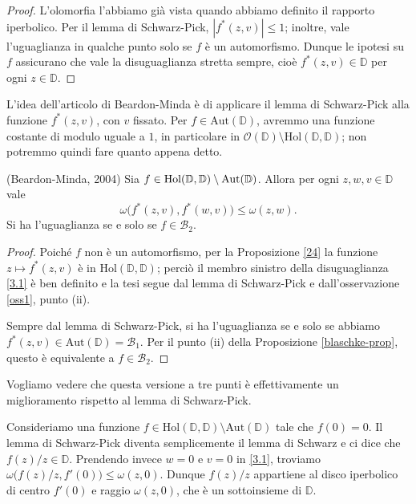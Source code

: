 \begin{proof}
  L'olomorfia l'abbiamo già vista quando abbiamo definito il rapporto iperbolico. Per il lemma di Schwarz-Pick, $|f^*(z,v)| \le 1$; inoltre, vale l'uguaglianza in qualche punto solo se $f$ è un automorfismo. Dunque le ipotesi su $f$ assicurano che vale la disuguaglianza stretta sempre, cioè $f^*(z,v) \in \mathbb{D}$ per ogni $z \in \mathbb{D}$.
\end{proof}

L'idea dell'articolo di Beardon-Minda è di applicare il lemma di Schwarz-Pick alla funzione $f^*(z,v)$, con $v$ fissato. Per $f \in \text{Aut}(\mathbb{D})$, avremmo una funzione costante di modulo uguale a $1$, in particolare in $\mathcal{O}(\mathbb{D})\setminus\text{Hol}(\mathbb{D},\mathbb{D})$; non potremmo quindi fare quanto appena detto.

\begin{thm} \label{31}
  (Beardon-Minda, 2004) Sia $f \in \text{\normalfont{Hol}}(\mathbb{D},\mathbb{D})\setminus\text{\normalfont{Aut}}(\mathbb{D})$. Allora per ogni $z, w, v \in \mathbb{D}$ vale
  \begin{equation} \label{3.1}
    \omega\bigl(f^*(z,v),f^*(w,v)\bigr) \le \omega(z,w).
  \end{equation}
  Si ha l'uguaglianza se e solo se $f \in \mathcal{B}_2$.
\end{thm}

\begin{proof}
  Poiché $f$ non è un automorfismo, per la Proposizione \ref{24} la funzione $z \longmapsto f^*(z,v)$ è in $\text{Hol}(\mathbb{D}, \mathbb{D})$; perciò il membro sinistro della disuguaglianza \eqref{3.1} è ben definito e la tesi segue dal lemma di Schwarz-Pick e dall'osservazione \ref{oss1}, punto (ii).

  Sempre dal lemma di Schwarz-Pick, si ha l'uguaglianza se e solo se abbiamo $f^*(z,v) \in \text{Aut}(\mathbb{D})=\mathcal{B}_1$. Per il punto (ii) della Proposizione \ref{blaschke-prop}, questo è equivalente a $f \in \mathcal{B}_2$.
\end{proof}

Vogliamo vedere che questa versione a tre punti è effettivamente un miglioramento rispetto al lemma di Schwarz-Pick.

\begin{ex}
  Consideriamo una funzione $f \in \text{Hol}(\mathbb{D},\mathbb{D})\setminus\text{Aut}(\mathbb{D})$ tale che $f(0)=0$. Il lemma di Schwarz-Pick diventa semplicemente il lemma di Schwarz e ci dice che $f(z)/z \in \mathbb{D}$. Prendendo invece $w=0$ e $v=0$ in \eqref{3.1}, troviamo $\omega\bigl(f(z)/z,f'(0)\bigr) \le \omega(z,0)$.
  Dunque $f(z)/z$ appartiene al disco iperbolico di centro $f'(0)$ e raggio $\omega(z,0)$, che è un sottoinsieme di $\mathbb{D}$.
\end{ex}

